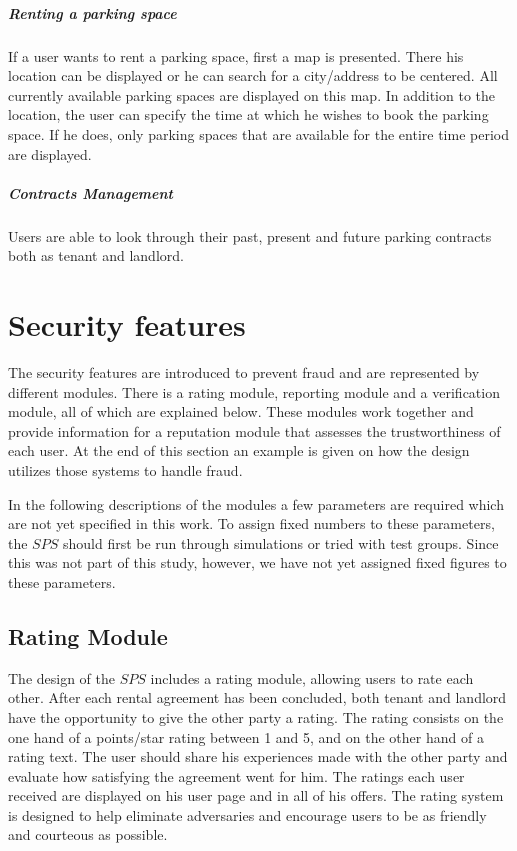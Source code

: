 \subparagraph{Renting a parking space} If a user wants to rent a parking space, first a map is presented. There his location can be displayed or he can search for a city/address to be centered. All currently available parking spaces are displayed on this map. In addition to the location, the user can specify the time at which he wishes to book the parking space. If he does, only parking spaces that are available for the entire time period are displayed.

\subparagraph{Contracts Management} Users are able to look through their past, present and future parking contracts both as tenant and landlord.
  
\section{Security features}
The security features are introduced to prevent fraud and are represented by different modules. There is a rating module, reporting module and a verification module, all of which are explained below. These modules work together and provide information for a reputation module that assesses the trustworthiness of each user. At the end of this section an example is given on how the design utilizes those systems to handle fraud.

In the following descriptions of the modules a few parameters are required which are not yet specified in this work. To assign fixed numbers to these parameters, the $SPS$ should first be run through simulations or tried with test groups. Since this was not part of this study, however, we have not yet assigned fixed figures to these parameters.

\subsection{Rating Module} The design of the $SPS$ includes a rating module, allowing users to rate each other. After each rental agreement has been concluded, both tenant and landlord have the opportunity to give the other party a rating. The rating consists on the one hand of a points/star rating between 1 and 5, and on the other hand of a rating text. The user should share his experiences made with the other party and evaluate how satisfying the agreement went for him. The ratings each user received are displayed on his user page and in all of his offers. The rating system is designed to help eliminate adversaries and encourage users to be as friendly and courteous as possible.

